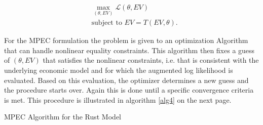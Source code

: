 \begin{equation}
\begin{aligned}
& \max_{(\theta, EV)} \mathcal{L}(\theta, EV) \\
& \text{subject to } EV = T(EV, \theta).
\end{aligned}
\label{eq2}
\end{equation}

For the MPEC formulation the problem is given to an optimization Algorithm that can handle nonlinear equality constraints. This algorithm then fixes a guess of $(\theta, EV)$ that satisfies the nonlinear constraints, i.e. that is consistent with the underlying economic model and for which the augmented log likelihood is evaluated. Based on this evaluation, the optimizer determines a new guess and the procedure starts over. Again this is done until a specific convergence criteria is met. This procedure is illustrated in algorithm \ref{alg4} on the next page. 


\vspace{2ex}
\begin{algorithm}[!h]
	\caption{MPEC Algorithm for the Rust Model}
	\label{alg4}
	\SetAlgoLined
\end{algorithm}
\vspace{2ex}

